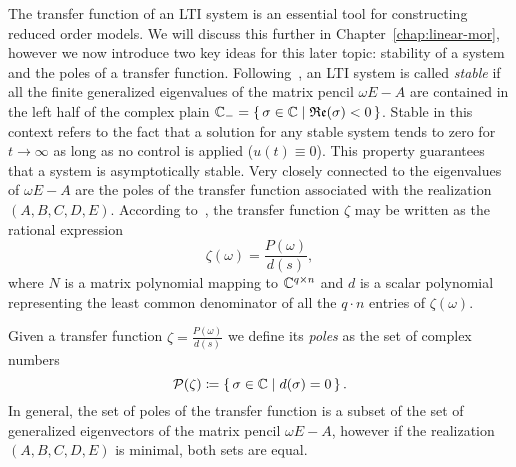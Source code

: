 The transfer function of an \ac{LTI} system is an essential tool for constructing reduced order models.
We will discuss this further in Chapter~\ref{chap:linear-mor}, however we now introduce two key ideas for this later topic: stability of a system and the poles of a transfer function.
Following~\cite{Benner2017}, an \ac{LTI} system is called \emph{stable} if all the finite generalized eigenvalues of the matrix pencil $\omega E - A$ are contained in the left half of the complex plain $\mathbb{C}_{-} = \left\{\,\sigma \in \mathbb{C}\mid\mathfrak{Re}(\sigma) < 0\,\right\}$.
Stable in this context refers to the fact that a solution for any stable system tends to zero for $t \rightarrow \infty$ as long as no control is applied ($u(t) \equiv 0$).
This property guarantees that a system is asymptotically stable.
Very closely connected to the eigenvalues of $\omega E - A$ are the poles of the transfer function associated with the realization $(A, B, C, D, E)$.
According to~\cite[Section~2]{Benner2017}, the transfer function $\zeta$ may be written as the rational expression
\begin{equation*}
    \zeta(\omega) = \frac{P(\omega)}{d(s)},
\end{equation*}
where $N$ is a matrix polynomial mapping to $\mathbb{C}^{q \times n}$ and $d$ is a scalar polynomial representing the least common denominator of all the $q \cdot n$ entries of $\zeta(\omega)$.

\begin{definition}\label{def:transfer-function-poles}
    Given a transfer function $\zeta = \frac{P(\omega)}{d(s)}$ we define its \emph{poles} as the set of complex numbers
    \begin{equation*}
        \mathcal{P}(\zeta) \coloneqq \left\{\,\sigma \in \mathbb{C}\mid d(\sigma) = 0\,\right\}.
    \end{equation*}
    In general, the set of poles of the transfer function is a subset of the set of generalized eigenvectors of the matrix pencil $\omega E - A$, however if the realization $(A, B, C, D, E)$ is minimal, both sets are equal.
\end{definition}
